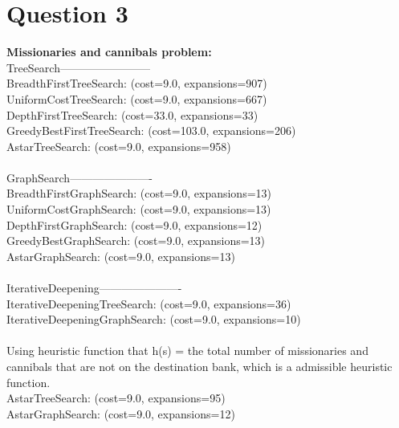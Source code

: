 \documentclass[letterpaper, 12pt]{artikel3}
\begin{document}
\section*{Question 3}
\textbf{Missionaries and cannibals problem:}\\
TreeSearch------------------------ \\
BreadthFirstTreeSearch:		(cost=9.0, expansions=907)\\
UniformCostTreeSearch:		(cost=9.0, expansions=667)\\
DepthFirstTreeSearch:		(cost=33.0, expansions=33)\\
GreedyBestFirstTreeSearch:	(cost=103.0, expansions=206)\\
AstarTreeSearch:		(cost=9.0, expansions=958)\\
\\
GraphSearch---------------------- \\
BreadthFirstGraphSearch:	(cost=9.0, expansions=13)\\
UniformCostGraphSearch:		(cost=9.0, expansions=13)	\\
DepthFirstGraphSearch:		(cost=9.0, expansions=12)	\\
GreedyBestGraphSearch:		(cost=9.0, expansions=13)	\\
AstarGraphSearch:		(cost=9.0, expansions=13)	\\
\\
IterativeDeepening----------------------	\\ 
IterativeDeepeningTreeSearch:	(cost=9.0, expansions=36)\\
IterativeDeepeningGraphSearch:   (cost=9.0, expansions=10)	\\ 
\\
Using heuristic function that h(s) =  the total number of missionaries and cannibals that are not on the destination bank, which is a admissible heuristic function.\\
AstarTreeSearch:		(cost=9.0, expansions=95)	\\
AstarGraphSearch:		(cost=9.0, expansions=12)\\
\end{document}
